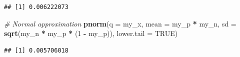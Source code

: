 \documentclass[
]{book}
\newenvironment{Shaded}{\begin{snugshade}}{\end{snugshade}}
\newcommand{\CommentTok}[1]{\textcolor[rgb]{0.56,0.35,0.01}{\textit{#1}}}
\newcommand{\DataTypeTok}[1]{\textcolor[rgb]{0.13,0.29,0.53}{#1}}
\newcommand{\DecValTok}[1]{\textcolor[rgb]{0.00,0.00,0.81}{#1}}
\newcommand{\KeywordTok}[1]{\textcolor[rgb]{0.13,0.29,0.53}{\textbf{#1}}}
\newcommand{\NormalTok}[1]{#1}
\newcommand{\OperatorTok}[1]{\textcolor[rgb]{0.81,0.36,0.00}{\textbf{#1}}}
\newcommand{\OtherTok}[1]{\textcolor[rgb]{0.56,0.35,0.01}{#1}}
\newcommand{\StringTok}[1]{\textcolor[rgb]{0.31,0.60,0.02}{#1}}
\begin{document}
\begin{verbatim}
## [1] 0.006222073
\end{verbatim}

\begin{Shaded}
\begin{Highlighting}[]
\CommentTok{# Normal approximation}
\KeywordTok{pnorm}\NormalTok{(}\DataTypeTok{q =}\NormalTok{ my_x, }\DataTypeTok{mean =}\NormalTok{ my_p }\OperatorTok{*}\StringTok{ }\NormalTok{my_n, }\DataTypeTok{sd =} \KeywordTok{sqrt}\NormalTok{(my_n }\OperatorTok{*}\StringTok{ }\NormalTok{my_p }\OperatorTok{*}\StringTok{ }\NormalTok{(}\DecValTok{1} \OperatorTok{-}\StringTok{ }\NormalTok{my_p)), }\DataTypeTok{lower.tail =} \OtherTok{TRUE}\NormalTok{)}
\end{Highlighting}
\end{Shaded}

\begin{verbatim}
## [1] 0.005706018
\end{verbatim}
\end{document}
